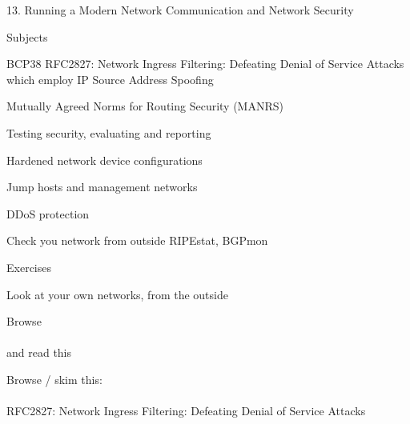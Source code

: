 \documentclass[Screen16to9,17pt]{foils}
\begin{document}
\mytitlepage
{13. Running a Modern Network}
{Communication and Network Security \the\year}




\begin{list1}
\item Subjects
\begin{list2}
\item BCP38 RFC2827: Network Ingress Filtering: Defeating Denial of Service Attacks\\
 which employ IP Source Address Spoofing
\item Mutually Agreed Norms for Routing Security (MANRS)
\item Testing security, evaluating and reporting
\item Hardened network device configurations
\item Jump hosts and management networks
\item DDoS protection
\item Check you network from outside RIPEstat, BGPmon
\end{list2}
\item Exercises
\begin{list2}
\item Look at your own networks, from the outside
\end{list2}
\end{list1}




\begin{list1}
\item Browse\\
\\
and read this\\ {\small{}}
\item Browse / skim this:\\
{\small{}}\\
RFC2827: Network Ingress Filtering: Defeating Denial of Service Attacks
\end{list1}


\end{document}
